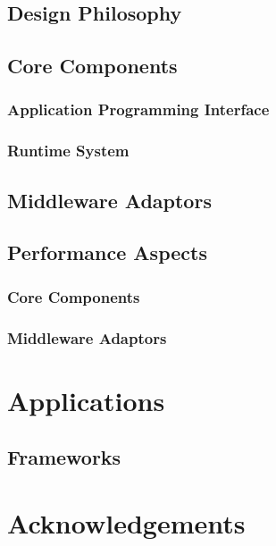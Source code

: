 \documentclass[a4paper,10pt]{article}
\begin{document}
 \subsection{Design Philosophy}

 \subsection{Core Components}

 \subsubsection{Application Programming Interface}

 \subsubsection{Runtime System}

 \subsection{Middleware Adaptors}

 \subsection{Performance Aspects}

 \subsubsection{Core Components}

 \subsubsection{Middleware Adaptors}

 \section{Applications}

 \subsection{Frameworks}


 \section{Acknowledgements}
 
 
 

  
 
\end{document}

